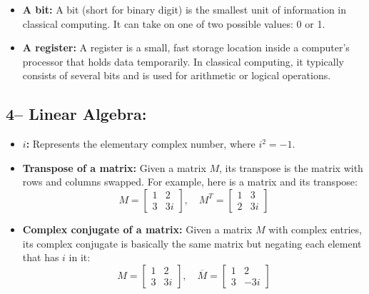 \begin{itemize}
    \item \textbf{A bit:} A bit (short for binary digit) is the smallest unit of information in classical computing. It can take on one of two possible values: 0 or 1.

    \item \textbf{A register:} A register is a small, fast storage location inside a computer's processor that holds data temporarily. In classical computing, it typically consists of several bits and is used for arithmetic or logical operations.
\end{itemize}

\subsection*{4– Linear Algebra:}

\begin{itemize}
    \item \textbf{\(i\):} Represents the elementary complex number, where \( i^2 = -1 \).

    \item \textbf{Transpose of a matrix:} Given a matrix \( M \), its transpose is the matrix with rows and columns swapped. For example, here is a matrix and its transpose:
    \[
    M = \begin{bmatrix} 1 & 2 \\ 3 & 3i \end{bmatrix}, \quad
    M^T = \begin{bmatrix} 1 & 3 \\ 2 & 3i \end{bmatrix}
    \]

    \item \textbf{Complex conjugate of a matrix:} Given a matrix \( M \) with complex entries, its complex conjugate is basically the same matrix but negating each element that has \(i\) in it:
    \[
    M = \begin{bmatrix} 1 & 2 \\ 3 & 3i \end{bmatrix}, \quad
    \overline{M} = \begin{bmatrix} 1 & 2 \\ 3 & -3i \end{bmatrix}
    \]
\end{itemize}

